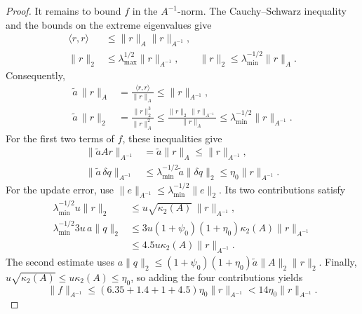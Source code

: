 \documentclass[10pt,a4paper]{amsart}
\begin{document}
\begin{proof}
It remains to bound $f$ in the $A^{-1}$-norm. The Cauchy--Schwarz
inequality and the bounds on the extreme eigenvalues give
\begin{equation}
\begin{aligned}
 \langle r,r\rangle&\le\|r\|_A\|r\|_{A^{-1}},\\
 \|r\|_2&\le\lambda_{\max}^{1/2}\|r\|_{A^{-1}},
 \qquad
 \|r\|_2\le\lambda_{\min}^{-1/2}\|r\|_A.
\end{aligned}
 \label{eq:three-inequalities}
\end{equation}
Consequently,
\begin{equation}
\begin{aligned}
 \tilde a\,\|r\|_A
   &=\frac{\langle r,r\rangle}{\|r\|_A}
     \le\|r\|_{A^{-1}},\\
 \tilde a\,\|r\|_2
   &=\frac{\|r\|_2^3}{\|r\|_A^2}
     \le\frac{\|r\|_2\,\|r\|_{A^{-1}}}{\|r\|_A}
     \le\lambda_{\min}^{-1/2}\|r\|_{A^{-1}}.
\end{aligned}
 \label{eq:a-tilde-bounds}
\end{equation}
For the first two terms of $f$, these inequalities give
\[
\begin{aligned}
 \|\tilde aAr\|_{A^{-1}}
   &=\tilde a\|r\|_A\le\|r\|_{A^{-1}},\\
 \|\tilde a\,\delta q\|_{A^{-1}}
   &\le\lambda_{\min}^{-1/2}\tilde a\|\delta q\|_2
     \le\eta_0\|r\|_{A^{-1}}.
\end{aligned}
\]
For the update error, use
$\|e\|_{A^{-1}}\le\lambda_{\min}^{-1/2}\|e\|_2$.
Its two contributions satisfy
\[
\begin{aligned}
 \lambda_{\min}^{-1/2}u\|r\|_2
   &\le u\sqrt{\kappa_2(A)}\,\|r\|_{A^{-1}},\\
 \lambda_{\min}^{-1/2}3u\,a\|q\|_2
   &\le3u(1+\psi_0)(1+\eta_0)\kappa_2(A)\|r\|_{A^{-1}}\\
   &\le4.5u\kappa_2(A)\|r\|_{A^{-1}}.
\end{aligned}
\]
The second estimate uses
$a\|q\|_2\le(1+\psi_0)(1+\eta_0)\tilde a\|A\|_2\|r\|_2$.
Finally, $u\sqrt{\kappa_2(A)}\le u\kappa_2(A)\le\eta_0$, so adding
the four contributions yields
\[
 \|f\|_{A^{-1}}
 \le(6.35+1.4+1+4.5)\eta_0\|r\|_{A^{-1}}
 <14\eta_0\|r\|_{A^{-1}}.
\]
\end{proof}
\end{document}
